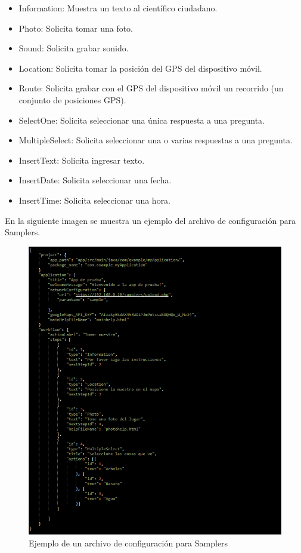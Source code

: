 \begin{itemize}

\item Information: Muestra un texto al científico ciudadano.

\item Photo: Solicita tomar una foto.

\item Sound: Solicita grabar sonido.

\item Location: Solicita tomar la posición del GPS del dispositivo móvil.

\item Route: Solicita grabar con el GPS del dispositivo móvil un recorrido (un conjunto de posiciones GPS).

\item SelectOne: Solicita seleccionar una única respuesta a una pregunta.

\item MultipleSelect: Solicita seleccionar una o varias respuestas a una pregunta.

\item InsertText: Solicita ingresar texto.

\item InsertDate: Solicita seleccionar una fecha.

\item InsertTime: Solicita seleccionar una hora.

\end{itemize}

En la siguiente imagen se muestra un ejemplo del archivo de configuración para Samplers.
\begin{figure}[H]
  \centering
    \includegraphics[width=\textwidth]{05-implementacion/archivo_config_ejemplo.png} 
   \caption{Ejemplo de un archivo de configuración para Samplers}
\end{figure}

